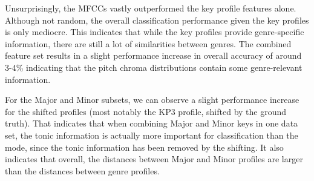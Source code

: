 \documentclass{article}
\begin{document}
\begin{table}
\begin{center}
    \caption{Classification accuracy for different feature combinations.}
    \label{tab:accuracyPC}
  \end{center}
\end{table}

Unsurprisingly, the MFCCs vastly outperformed the key profile features alone. Although not random, the overall classification performance given the key profiles is only mediocre. This indicates that while the key profiles provide genre-specific information, there are still a lot of similarities between genres. The combined feature set results in a slight performance increase in overall accuracy of around 3-4\% indicating that the pitch chroma distributions contain some genre-relevant information. 

For the Major and Minor subsets, we can observe a slight performance increase for the shifted profiles (most notably the KP3 profile, shifted by the ground truth). That indicates that when combining Major and Minor keys in one data set, the tonic information is actually more important for classification than the mode, since the tonic information has been removed by the shifting. It also indicates that overall, the distances between Major and Minor profiles are larger than the distances between genre profiles. 
\end{document}
